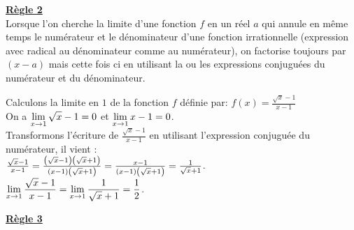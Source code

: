 \underline{\textbf{Règle 2}}\\

Lorsque l'on cherche la limite d'une fonction $ f $ en un réel $ a $ qui annule en même
temps le numérateur et le dénominateur d'une fonction irrationnelle (expression
avec radical au dénominateur comme au numérateur), on factorise toujours par
$( x - a )$ mais cette fois ci en utilisant la ou les expressions conjuguées du
numérateur et du dénominateur. 
\begin{example}

Calculons la limite en $ 1 $ de la fonction $ f $ définie par:  \;$ f(x)=\frac{\sqrt{x}-1}{x-1} $\\
 On a $ \displaystyle \lim_{x\to 1}\sqrt{x}-1=0 $ et $ \displaystyle \lim_{x\to 1}x-1=0 $.\\Transformons l'écriture de  $ \frac{\sqrt{x}-1}{x-1} $ en utilisant l'expression conjuguée du
numérateur, il vient :\\ $ \frac{\sqrt{x}-1}{x-1}= \frac{\left(\sqrt{x}-1\right)\left(\sqrt{x}+1\right)}{(x-1)\left(\sqrt{x}+1\right)} =\frac{x-1}{(x-1)\left(\sqrt{x}+1\right)}=\frac{1}{\sqrt{x}+1}$.\\ $ \displaystyle \lim_{x\to 1}\frac{\sqrt{x}-1}{x-1}= \displaystyle \lim_{x\to 1}\frac{1}{\sqrt{x}+1}=\frac{1}{2}$.
\end{example}

 \underline{\textbf{Règle 3}}\\

